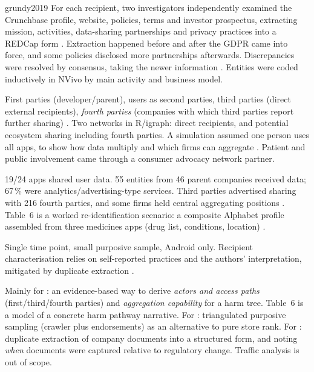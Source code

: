 \begin{papercard}{grundy2019}
 For each recipient, two investigators independently examined the Crunchbase profile, website, policies, terms and investor prospectus, extracting mission, activities, data-sharing partnerships and privacy practices into a REDCap form . Extraction happened before and after the GDPR came into force, and some policies disclosed more partnerships afterwards. Discrepancies were resolved by consensus, taking the newer information . Entities were coded inductively in NVivo by main activity and business model.

 First parties (developer/parent), users as second parties, third parties (direct external recipients), \emph{fourth parties} (companies with which third parties report further sharing) . Two networks in R/igraph: direct recipients, and potential ecosystem sharing including fourth parties. A simulation assumed one person uses all apps, to show how data multiply and which firms can aggregate . Patient and public involvement came through a consumer advocacy network partner.

 19/24 apps shared user data. 55 entities from 46 parent companies received data; 67\,\% were analytics/advertising-type services. Third parties advertised sharing with 216 fourth parties, and some firms held central aggregating positions . Table~6 is a worked re-identification scenario: a composite Alphabet profile assembled from three medicines apps (drug list, conditions, location) .

 Single time point, small purposive sample, Android only. Recipient characterisation relies on self-reported practices and the authors' interpretation, mitigated by duplicate extraction .

 Mainly for : an evidence-based way to derive \emph{actors and access paths} (first/third/fourth parties) and \emph{aggregation capability} for a harm tree. Table~6 is a model of a concrete harm pathway narrative. For : triangulated purposive sampling (crawler plus endorsements) as an alternative to pure store rank. For : duplicate extraction of company documents into a structured form, and noting \emph{when} documents were captured relative to regulatory change. Traffic analysis is out of scope.
\end{papercard}
